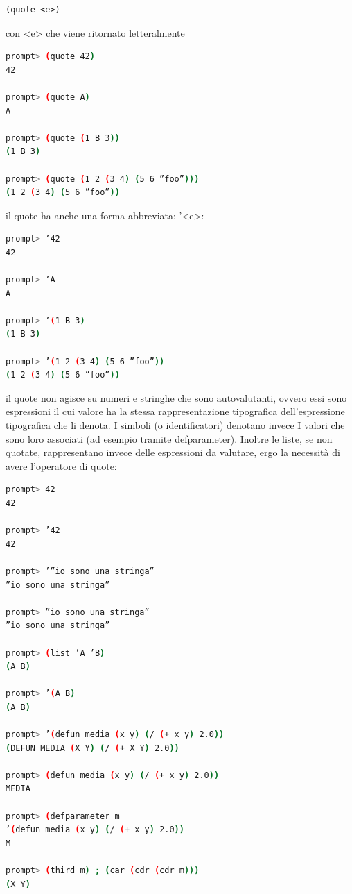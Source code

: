 \documentclass[a4paper,12pt, oneside]{book}
\begin{document}
\begin{verbatim}
(quote <e>)
\end{verbatim}
con <e> che viene ritornato letteralmente
\begin{shaded}
\begin{lstlisting}[language=bash]
prompt> (quote 42)
42

prompt> (quote A)
A

prompt> (quote (1 B 3))
(1 B 3)

prompt> (quote (1 2 (3 4) (5 6 ”foo”)))
(1 2 (3 4) (5 6 ”foo”))
\end{lstlisting}
\end{shaded}
il quote ha anche una forma abbreviata: '<e>:
\begin{shaded}
\begin{lstlisting}[language=bash]
prompt> ’42 
42

prompt> ’A
A

prompt> ’(1 B 3)
(1 B 3)

prompt> ’(1 2 (3 4) (5 6 ”foo”))
(1 2 (3 4) (5 6 ”foo”))
\end{lstlisting}
\end{shaded}
il quote non agisce su numeri e stringhe che sono autovalutanti, ovvero essi sono
espressioni il cui valore ha la stessa rappresentazione tipografica dell'espressione
tipografica che li denota. I simboli (o identificatori) denotano invece I valori che sono loro associati (ad
esempio tramite defparameter). Inoltre le liste, se non quotate, rappresentano invece delle espressioni da valutare, ergo la
necessità di avere l’operatore di quote:
\begin{shaded}
\begin{lstlisting}[language=bash]
prompt> 42
42

prompt> ’42
42

prompt> ’”io sono una stringa”
”io sono una stringa”

prompt> ”io sono una stringa”
”io sono una stringa”

prompt> (list ’A ’B)
(A B)

prompt> ’(A B)
(A B)

prompt> ’(defun media (x y) (/ (+ x y) 2.0))
(DEFUN MEDIA (X Y) (/ (+ X Y) 2.0))

prompt> (defun media (x y) (/ (+ x y) 2.0))
MEDIA

prompt> (defparameter m
’(defun media (x y) (/ (+ x y) 2.0))
M

prompt> (third m) ; (car (cdr (cdr m)))
(X Y)
\end{lstlisting}
\end{shaded} 
\end{document}
